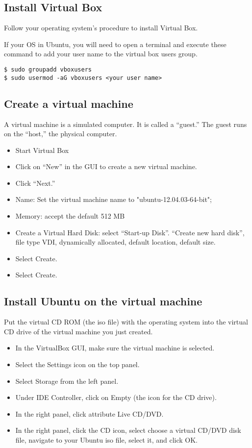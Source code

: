 \documentclass{article}
\begin{document}
\subsection{Install Virtual Box}

Follow your operating system's procedure to install Virtual Box.

If your OS in Ubuntu, you will need to open a terminal and execute these
command to add your user name to the virtual box users group.

\begin{verbatim}
$ sudo groupadd vboxusers
$ sudo usermod -aG vboxusers <your user name>
\end{verbatim}

\subsection{Create a virtual machine}

A virtual machine is a simulated computer. It is called a ``guest.'' The
guest runs on the ``host,'' the physical computer.

\begin{itemize}
  \item Start Virtual Box
  \item Click on ``New'' in the GUI to create a new virtual machine.
  \item Click ``Next.''
  \item Name: Set the virtual machine name to "ubuntu-12.04.03-64-bit"; 
  \item Memory: accept the default 512 MB
  \item Create a Virtual Hard Disk: select ``Start-up Disk''. ``Create new hard
  disk'', file type VDI, dynamically allocated, default location,
  default size.
\item Select Create.
\item Select Create.
\end{itemize}

\subsection{Install Ubuntu on the virtual machine}

Put the virtual CD ROM (the iso file) with the operating system into the virtual CD
drive of the virtual machine you just created.

\begin{itemize}
  \item In the VirtualBox GUI, make sure the virtual machine is
    selected.
  \item Select the Settings icon on the top panel.
  \item Select Storage from the left panel.
  \item Under IDE Controller, click on Empty (the icon for the CD
    drive).
  \item In the right panel, click attribute Live CD/DVD.
  \item In the right panel, click the CD icon, select choose a virtual
    CD/DVD disk file, navigate to your Ubuntu iso file, select it, and
    click OK.
\end{itemize}
\end{document}
